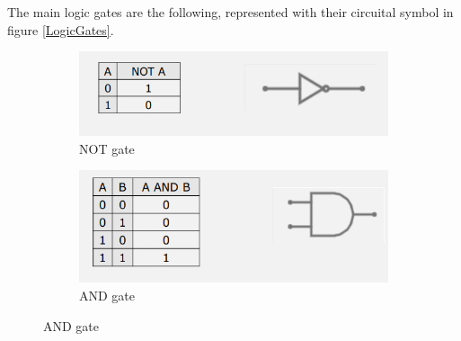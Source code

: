 \documentclass{article}
\begin{document}
\vspace{3mm}

The main logic gates are the following, represented with their circuital symbol in figure \ref{LogicGates}.

\begin{figure}[h!]

    \centering
    \begin{subfigure}{.4\textwidth}
        \centering
        \includegraphics[width=\linewidth]{IM_NOT.PNG}
        \caption{NOT gate}
        \label{NOT}
    \end{subfigure}
    \hfill
    \begin{subfigure}{.4\textwidth}
        \centering
        \includegraphics[width=\linewidth]{IM_AND.PNG}
        \caption{AND gate}
        \label{AND}        
    \end{subfigure}
    

\end{figure}
\end{document}
